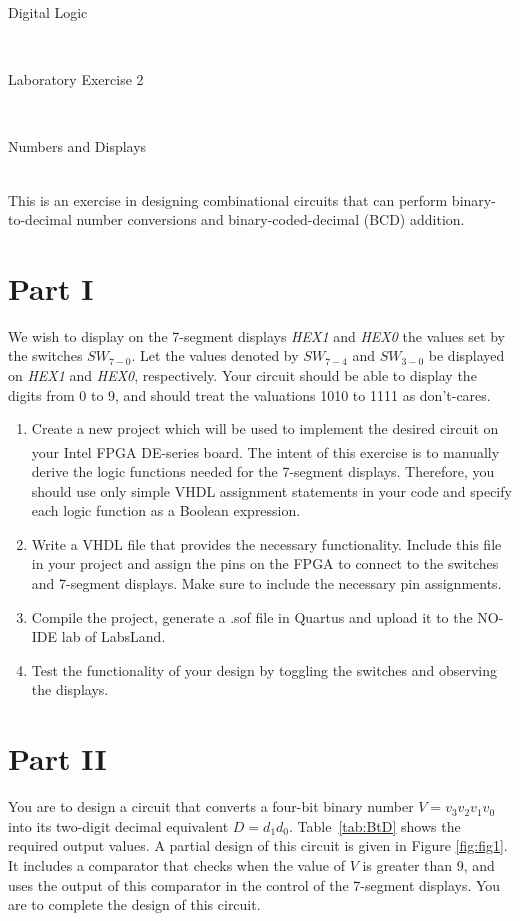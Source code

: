 \documentclass[epsfig,10pt,fullpage]{article}
\newcommand{\LabNum}{2}
\begin{document}
\centerline{\huge Digital Logic}
~\\
\centerline{\huge Laboratory Exercise \LabNum}
~\\
\centerline{\large Numbers and Displays}
~\\

\noindent
This is an exercise in designing combinational circuits that can perform
binary-to-decimal number conversions and binary-coded-decimal (BCD) addition.
~\\

\section*{Part I}
We wish to display on the 7-segment displays {\it HEX1} and {\it HEX0} the 
values set by the switches $SW_{7-0}$. 
Let the values denoted by $SW_{7-4}$ and $SW_{3-0}$ be displayed on {\it HEX1} and {\it HEX0}, 
respectively.
Your circuit should be able to display the digits from 0 to 9, and should treat the
valuations 1010 to 1111 as don't-cares.

\begin{enumerate}
\item Create a new project which will be used to implement the desired
circuit on your Intel\textsuperscript{\textregistered} FPGA DE-series board. The intent of this exercise is to manually 
derive the logic functions needed for the 7-segment displays. Therefore, you should use only
simple VHDL assignment statements in your code and specify each logic function as
a Boolean expression.
\item Write a VHDL file that provides the necessary functionality. Include this 
file in your project and assign the pins on the FPGA to connect to the 
switches and 7-segment displays. Make sure to include the necessary pin assignments.
\item Compile the project, generate a .sof file in Quartus and upload it to the NO-IDE lab of LabsLand.
\item Test the functionality of your design by toggling the switches
and observing the displays.
\end{enumerate}

\section*{Part II}
You are to design a circuit that converts a four-bit binary number $V = v_3 v_2 v_1 v_0$
into its two-digit decimal equivalent $D = d_1 d_0$. Table~\ref{tab:BtD} shows the required output
values. A partial design of this circuit is given in Figure \ref{fig:fig1}. It includes a comparator
that checks when the value of $V$ is greater than 9, and uses the output of this
comparator in the control of the 7-segment displays. You are to complete the design of
this circuit. 
\end{document}
